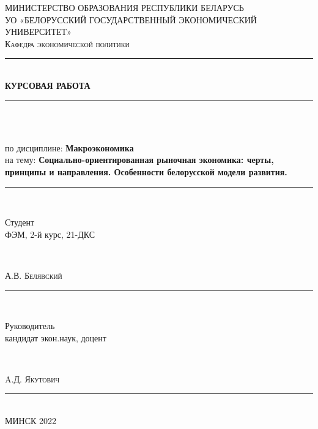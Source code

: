\documentclass[14pt,a4paper]{article}
\newenvironment{linez}
{\trivlist\nopagebreak
\parindent0pt
\item\relax\obeylines}
{\par
\vspace{3pt}%
\endtrivlist}
\begin{document}
    \begin{titlepage}
        \newcommand{\HRule}{\rule{\linewidth}{0mm}}
        \center
        \textsc{\Large МИНИСТЕРСТВО ОБРАЗОВАНИЯ РЕСПУБЛИКИ БЕЛАРУСЬ}\\[0cm]
        \renewcommand{\baselinestretch}{1.5}
        \textsc{\Large УО «БЕЛОРУССКИЙ ГОСУДАРСТВЕННЫЙ ЭКОНОМИЧЕСКИЙ УНИВЕРСИТЕТ»}\\[2cm]
        \textsc{ Кафедра экономической политики}\\[0.5cm]
        \HRule\\[1cm]
        {\bfseries КУРСОВАЯ РАБОТА}\\[0.4cm]
        \HRule\\[0cm]
        \begin{linez}
            \\ по дисциплине: {\bfseries Макроэкономика}
            \\ на тему: {\bfseries Социально-ориентированная рыночная экономика: черты, принципы и направления. Особенности белорусской модели развития.}
        \end{linez}
        \HRule\\[2cm]

        \begin{minipage}{0.4\textwidth}
            \begin{flushleft}
                \large{Студент}\\
                \vspace{-5pt}
                ФЭМ, 2-й курс, 21-ДКС
            \end{flushleft}
        \end{minipage}
        ~
        \begin{minipage}{0.4\textwidth}
            \begin{flushleft}
                \hspace{1.5cm}
                А.В. \textsc{Белявский}
            \end{flushleft}
        \end{minipage}
        \HRule\\[0.5cm]
        \begin{minipage}{0.4\textwidth}
            \begin{flushleft}
                \large{Руководитель}\\
                \vspace{-5pt}
                кандидат экон.наук, доцент
            \end{flushleft}
        \end{minipage}
        ~
        \begin{minipage}{0.4\textwidth}
            \begin{flushleft}
                \hspace{1.5cm}
                A.Д. \textsc{Якутович}
            \end{flushleft}
        \end{minipage}

        \HRule\\[5.5cm]
        {\large МИНСК 2022}
        \vfill
    \end{titlepage}
\end{document}
